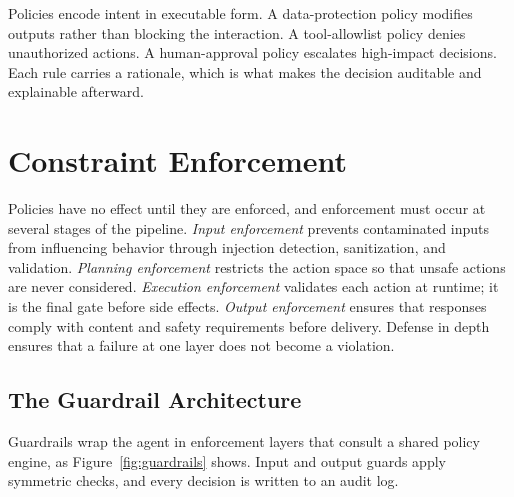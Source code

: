 \documentclass[11pt]{book}
\begin{document}
Policies encode intent in executable form. A data-protection policy modifies outputs rather than blocking the interaction. A tool-allowlist policy denies unauthorized actions. A human-approval policy escalates high-impact decisions. Each rule carries a rationale, which is what makes the decision auditable and explainable afterward.

\section{Constraint Enforcement}

Policies have no effect until they are enforced, and enforcement must occur at several stages of the pipeline. \textit{Input enforcement} prevents contaminated inputs from influencing behavior through injection detection, sanitization, and validation. \textit{Planning enforcement} restricts the action space so that unsafe actions are never considered. \textit{Execution enforcement} validates each action at runtime; it is the final gate before side effects. \textit{Output enforcement} ensures that responses comply with content and safety requirements before delivery. Defense in depth ensures that a failure at one layer does not become a violation.

\subsection{The Guardrail Architecture}

Guardrails wrap the agent in enforcement layers that consult a shared policy engine, as Figure~\ref{fig:guardrails} shows. Input and output guards apply symmetric checks, and every decision is written to an audit log.
\end{document}
